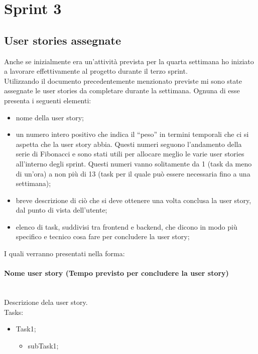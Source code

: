 
\section{Sprint 3}
\label{sec:sprint3}
\subsection{User stories assegnate}
Anche se inizialmente era un'attività prevista per la quarta settimana ho iniziato a lavorare effettivamente al progetto durante il terzo sprint. \\
Utilizzando il documento precedentemente menzionato previste mi sono state assegnate le user stories da completare durante la settimana.
\noindent Ognuna di esse presenta i seguenti elementi:
\begin{itemize}
  \item nome della user story;
  \item un numero intero positivo che indica il ``peso'' in termini temporali che ci si aspetta che la user story abbia. Questi numeri seguono l'andamento della serie di Fibonacci e sono stati utili per allocare meglio le varie user stories all'interno degli sprint. Questi numeri vanno solitamente da 1 (task da meno di un'ora) a non più di 13 (task per il quale può essere necessaria fino a una settimana); 
  \item breve descrizione di ciò che si deve ottenere una volta conclusa la user story, dal punto di vista dell'utente;
  \item elenco di task, suddivisi tra frontend e backend, che dicono in modo più specifico e tecnico cosa fare per concludere la user story;
\end{itemize}
I quali verranno presentati nella forma:

\paragraph{Nome user story (Tempo previsto per concludere la user story)}\mbox{} \\[\baselineskip]
\noindent Descrizione dela user story. \\

\noindent Tasks:

\begin{itemize}
  \item Task1;
  \begin{itemize}
    \item subTask1;
  \end{itemize}
\end{itemize}
\vspace*{5pt}
